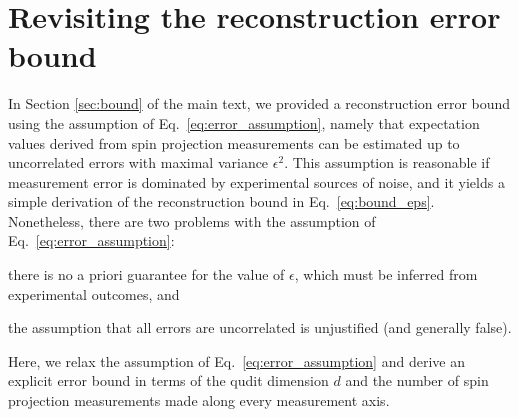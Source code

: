 \documentclass[notitlepage,twocolumn]{revtex4-2}
\begin{document}
\section{Revisiting the reconstruction error bound}
\label{sec:error}

In Section \ref{sec:bound} of the main text, we provided a reconstruction error bound using the assumption of Eq.~\eqref{eq:error_assumption}, namely that expectation values derived from spin projection measurements can be estimated up to uncorrelated errors with maximal variance $\epsilon^2$.
This assumption is reasonable if measurement error is dominated by experimental sources of noise, and it yields a simple derivation of the reconstruction bound in Eq.~\eqref{eq:bound_eps}.
Nonetheless, there are two problems with the assumption of Eq.~\eqref{eq:error_assumption}:
\begin{enumerate*}
\item there is no a priori guarantee for the value of $\epsilon$, which must be inferred from experimental outcomes, and
\item the assumption that all errors are uncorrelated is unjustified (and generally false).
\end{enumerate*}
Here, we relax the assumption of Eq.~\eqref{eq:error_assumption} and derive an explicit error bound in terms of the qudit dimension $d$ and the number of spin projection measurements made along every measurement axis.
\end{document}
